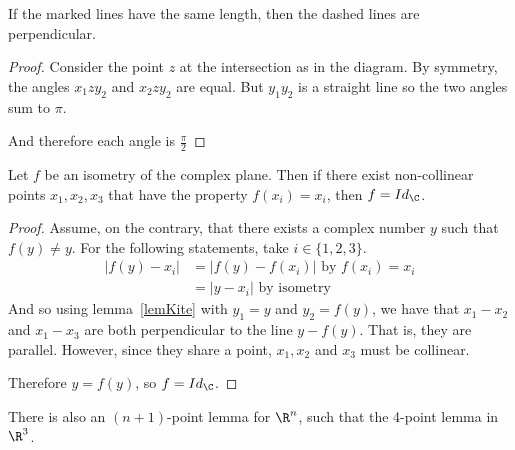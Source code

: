 \documentclass[../Main.tex]{subfiles}
\begin{document}
If the marked lines have the same length, then the dashed lines are perpendicular.\par
\begin{proof}
    Consider the point $z$ at the intersection as in the diagram. By symmetry, the angles $x_1 z y_2$ and $x_2 z y_2$ are equal. But $y_1 y_2$ is a straight line so the two angles sum to $\pi$.\par
    And therefore each angle is $\frac{\pi}{2}$
\end{proof}
\begin{lemma}
    Let $f$ be an isometry of the complex plane. Then if there exist non-collinear points $x_1, x_2, x_3$ that have the property $f(x_i) = x_i$, then $f = Id_\C$.
    \label{lem3Point}
\end{lemma}
\begin{proof}
    Assume, on the contrary, that there exists a complex number $y$ such that $f(y) \neq y$. For the following statements, take $i \in \{1, 2, 3\}$.
    \begin{align*}
        |f(y) - x_i| &= |f(y) - f(x_i)| \text{ by } f(x_i) = x_i \\
        &= |y - x_i| \text{ by isometry}
    \end{align*}
    And so using lemma~\ref{lemKite} with $y_1 = y$ and $y_2 = f(y)$, we have that $x_1 - x_2$ and $x_1 - x_3$ are both perpendicular to the line $y - f(y)$. That is, they are parallel. However, since they share a point, $x_1, x_2$ and $x_3$ must be collinear. \contradiction\par
    Therefore $y = f(y)$, so $f = Id_\C$.
\end{proof}
\begin{remark}
    There is also an $(n+1)$-point lemma for $\R^n$, such that the 4-point lemma in $\R^3$.
\end{remark}
\end{document}
